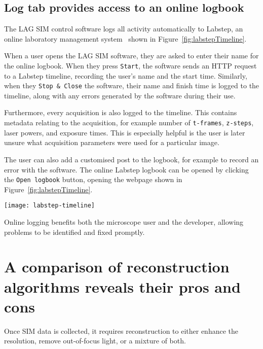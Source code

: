 \subsection{Log tab provides access to an online logbook}
The LAG SIM control software logs all activity automatically to Labstep, an online laboratory management system~\cite{labstep} shown in Figure~\ref{fig:labstepTimeline}.

When a user opens the LAG SIM software, they are asked to enter their name for the online logbook.
When they press \texttt{Start}, the software sends an HTTP request to a Labstep timeline,  recording the user's name and the start time.
Similarly, when they \texttt{Stop \& Close} the software, their name and finish time is logged to the timeline, along with any errors generated by the software during their use.

Furthermore, every acquisition is also logged to the timeline.
This contains metadata relating to the acquisition, for example number of \texttt{t-frames}, \texttt{z-steps}, laser powers, and exposure times.
This is especially helpful is the user is later unsure what acquisition parameters were used for a particular image.

The user can also add a customised post to the logbook, for example to record an error with the software.
The online Labstep logbook can be opened by clicking the \texttt{Open logbook} button, opening the webpage shown in Figure~\ref{fig:labstepTimeline}.

\begin{sidewaysfigure}[p]
\centering
\texttt{[image: labstep-timeline]}
\caption[LAG SIM: Logging user activity with Labstep allows any problems to be identified and fixed quickly]{User activity is automatically logged to an online logbook hosted on Labstep to identify and fix any problems quickly. This figure shows the user logged onto the SIM at 09:00, acquired 2 images - a SIM z-stack then a 1000-frame widefield video - then logged off.}
\label{fig:labstepTimeline}
\end{sidewaysfigure}

Online logging benefits both the microscope user and the developer, allowing problems to be identified and fixed promptly.

\clearpage
\section{A comparison of reconstruction algorithms reveals their pros and cons} \label{sec:recon}
Once SIM data is collected, it requires reconstruction to either enhance the resolution, remove out-of-focus light, or a mixture of both.


